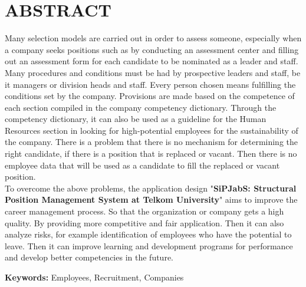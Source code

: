
\chapter*{ABSTRACT}
\vspace*{0.7cm}

Many selection models are carried out in order to assess someone, especially when a company seeks positions such as by conducting an assessment center and filling out an assessment form for each candidate to be nominated as a leader and staff. Many procedures and conditions must be had by prospective leaders and staff, be it managers or division heads and staff. Every person chosen means fulfilling the conditions set by the company. Provisions are made based on the competence of each section compiled in the company competency dictionary. Through the competency dictionary, it can also be used as a guideline for the Human Resources section in looking for high-potential employees for the sustainability of the company. There is a problem that there is no mechanism for determining the right candidate, if there is a position that is replaced or vacant. Then there is no employee data that will be used as a candidate to fill the replaced or vacant position.
\\

To overcome the above problems, the application design "\textbf{SiPJabS: Structural Position Management System at Telkom University}" aims to improve the career management process. So that the organization or company gets a high quality. By providing more competitive and fair application. Then it can also analyze risks, for example identification of employees who have the potential to leave. Then it can improve learning and development programs for performance and develop better competencies in the future.

\noindent \textbf{Keywords:} Employees, Recruitment, Companies\\ 

\newpage